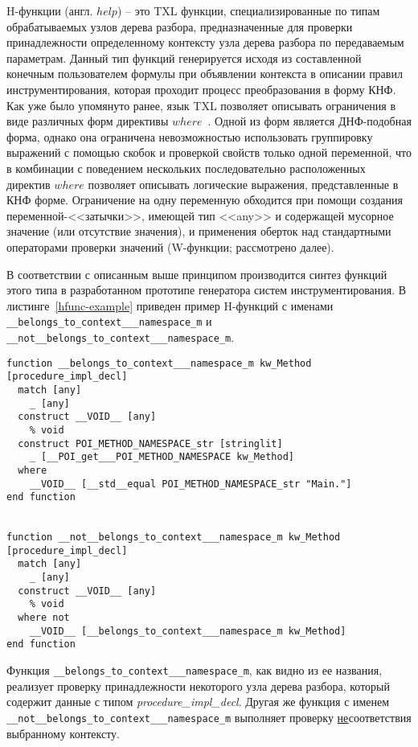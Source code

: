H-функции (англ. $help$) -- это TXL функции, специализированные по типам обрабатываемых узлов дерева разбора, предназначенные для проверки принадлежности определенному контексту узла дерева разбора по передаваемым параметрам.
Данный тип функций генерируется исходя из составленной конечным пользователем формулы при объявлении контекста в описании правил инструментирования, которая проходит процесс преобразования в форму КНФ.
Как уже было упомянуто ранее, язык TXL позволяет описывать ограничения в виде различных форм директивы $where$~\cite{txl-book}.
Одной из форм является ДНФ-подобная форма, однако она ограничена невозможностью использовать группировку выражений с помощью скобок и проверкой свойств только одной переменной, что в комбинации с поведением нескольких последовательно расположенных директив $where$ позволяет описывать логические выражения, представленные в КНФ форме.
Ограничение на одну переменную обходится при помощи создания переменной-<<затычки>>, имеющей тип <<any>> и содержащей мусорное значение (или отсутствие значения), и применения оберток над стандартными операторами проверки значений (W-функции; рассмотрено далее).

В соответствии с описанным выше принципом производится синтез функций этого типа в разработанном прототипе генератора систем инструментирования.
В листинге~\ref{hfunc-example} приведен пример H-функций с именами \lstinline{__belongs_to_context___namespace_m} и \lstinline{__not__belongs_to_context___namespace_m}.

\begin{lstlisting}[frame=single, language=TXL, label={hfunc-example}, caption={Пример синтезированной H-функций.}]
function __belongs_to_context___namespace_m kw_Method [procedure_impl_decl]
  match [any]
    _ [any]
  construct __VOID__ [any]
    % void
  construct POI_METHOD_NAMESPACE_str [stringlit]
    _ [__POI_get___POI_METHOD_NAMESPACE kw_Method]
  where
    __VOID__ [__std__equal POI_METHOD_NAMESPACE_str "Main."]
end function


function __not__belongs_to_context___namespace_m kw_Method [procedure_impl_decl]
  match [any]
    _ [any]
  construct __VOID__ [any]
    % void
  where not
    __VOID__ [__belongs_to_context___namespace_m kw_Method]
end function
\end{lstlisting}

Функция \lstinline{__belongs_to_context___namespace_m}, как видно из ее названия, реализует проверку принадлежности некоторого узла дерева разбора, который содержит данные с типом \textit{procedure\_impl\_decl}.
Другая же функция с именем \lstinline{__not__belongs_to_context___namespace_m} выполняет проверку \underline{не}соответствия выбранному контексту.

